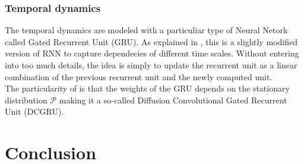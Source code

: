 \documentclass{article}
\begin{document}
\subsubsection*{Temporal dynamics}
The temporal dynamics are modeled with a particuliar type of Neural Netork called Gated Recurrent Unit (GRU). As explained in \cite{ChungGCB14}, this is a slightly modified version of RNN to capture dependecies of different time scales. Without entering into too much details, the idea is simply to update the recurrent unit as a linear combination of the previous recurrent unit and the newly computed unit. \\
The particularity of \cite{Traffic} is that the weights of the GRU depends on the stationary distribution $\mathcal{P}$ making it a so-called Diffusion Convolutional Gated Recurrent Unit (DCGRU).

\section{Conclusion}
\label{conc}



\end{document}
